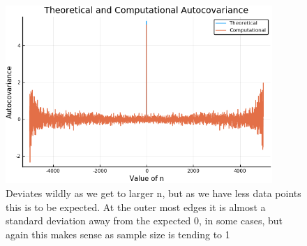 \documentclass[a4paper,12pt,notitlepage]{article}
\begin{document}
\begin{figure}
        \centering
        \includegraphics[width=0.9\textwidth]{largeautocov.png}
        \caption{Deviates wildly as we get to larger n, but as we have less data points this is to be expected. At the outer most edges it is almost a standard deviation away from the expected 0, in some cases, but again this makes sense as sample size is tending to 1}

\end{figure}
\end{document}
